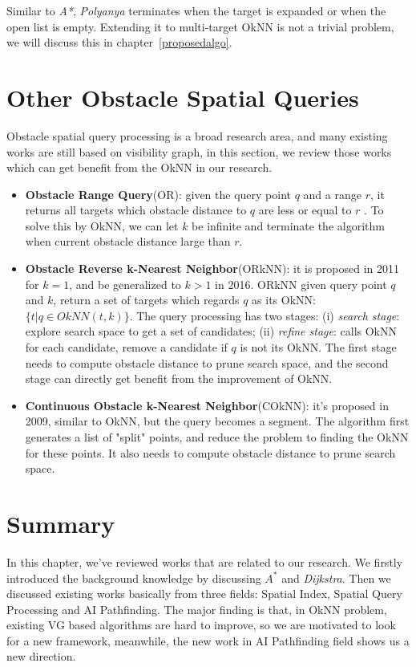 Similar to \textit{A*}, \textit{Polyanya} terminates when the target is expanded or when the
open list is empty. Extending it to multi-target OkNN is not a trivial problem, we will discuss
this in chapter~\ref{proposedalgo}.

\section{Other Obstacle Spatial Queries}\label{lrquery}
Obstacle spatial query processing is a broad research area, and many existing works are still
based on visibility graph, in this section, we review those works which can get benefit from
the OkNN in our research. 

\begin{itemize}

\item \textbf{Obstacle Range Query}(OR): given the query point $q$ and a range $r$,
  it returns all targets which obstacle distance to $q$ are less or equal to $r$ \cite{zhang2004spatial}. 
To solve this by OkNN, we can let $k$ be infinite and terminate the algorithm when current
obstacle distance large than $r$.

\item \textbf{Obstacle Reverse k-Nearest Neighbor}(ORkNN): it is proposed in
2011\cite{gao2011efficient} for $k=1$, and be generalized to $k>1$ in
2016\cite{gao2016reverse}. ORkNN given query point $q$ and $k$, return a set of targets which
regards $q$ as its OkNN: $\{t | q \in OkNN(t, k)\}$. The query processing has two stages:
(i) \textit{search stage}: explore search space to get a set of candidates; (ii) \textit{refine
stage}: calls OkNN for each candidate, remove a candidate if $q$ is not its OkNN.
The first stage needs to compute obstacle distance to prune search space, and the second stage 
can directly get benefit from the improvement of OkNN.

\item \textbf{Continuous Obstacle k-Nearest Neighbor}(COkNN): it's proposed in
  2009\cite{gao2009continuous}, similar to OkNN, but the query becomes a segment.
  The algorithm first generates a list of "split" points, and reduce the problem to finding the
    OkNN for these points. It also needs to compute obstacle distance to prune search space.

\end{itemize}

\section{Summary}
In this chapter, we've reviewed works that are related to our research.
We firstly introduced the background knowledge by discussing $\textit{A}^*$ and
\textit{Dijkstra}. 
Then we discussed existing works basically from three fields: Spatial Index, Spatial Query Processing and AI Pathfinding.
The major finding is that, in OkNN problem, existing VG based algorithms are hard to improve,
so we are motivated to look for a new framework, meanwhile,
the new work in AI Pathfinding field shows us a new direction.
